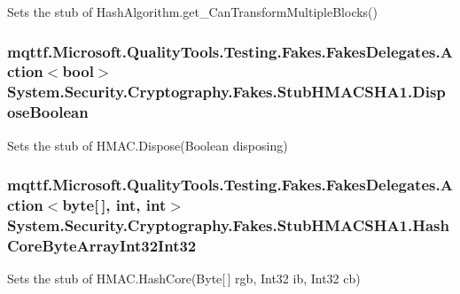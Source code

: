 Sets the stub of Hash\-Algorithm.\-get\-\_\-\-Can\-Transform\-Multiple\-Blocks()

\hypertarget{class_system_1_1_security_1_1_cryptography_1_1_fakes_1_1_stub_h_m_a_c_s_h_a1_a09d09f107a9611baf81b3697b6d0734e}{
\subsubsection[{Dispose\-Boolean}]{\setlength{\rightskip}{0pt plus 5cm}mqttf.\-Microsoft.\-Quality\-Tools.\-Testing.\-Fakes.\-Fakes\-Delegates.\-Action$<$bool$>$ System.\-Security.\-Cryptography.\-Fakes.\-Stub\-H\-M\-A\-C\-S\-H\-A1.\-Dispose\-Boolean}}\label{class_system_1_1_security_1_1_cryptography_1_1_fakes_1_1_stub_h_m_a_c_s_h_a1_a09d09f107a9611baf81b3697b6d0734e}


Sets the stub of H\-M\-A\-C.\-Dispose(\-Boolean disposing)

\hypertarget{class_system_1_1_security_1_1_cryptography_1_1_fakes_1_1_stub_h_m_a_c_s_h_a1_a278fb2abd60eed04ae02bf85d359467b}{
\subsubsection[{Hash\-Core\-Byte\-Array\-Int32\-Int32}]{\setlength{\rightskip}{0pt plus 5cm}mqttf.\-Microsoft.\-Quality\-Tools.\-Testing.\-Fakes.\-Fakes\-Delegates.\-Action$<$byte\mbox{[}$\,$\mbox{]}, int, int$>$ System.\-Security.\-Cryptography.\-Fakes.\-Stub\-H\-M\-A\-C\-S\-H\-A1.\-Hash\-Core\-Byte\-Array\-Int32\-Int32}}\label{class_system_1_1_security_1_1_cryptography_1_1_fakes_1_1_stub_h_m_a_c_s_h_a1_a278fb2abd60eed04ae02bf85d359467b}


Sets the stub of H\-M\-A\-C.\-Hash\-Core(\-Byte\mbox{[}$\,$\mbox{]} rgb, Int32 ib, Int32 cb)


